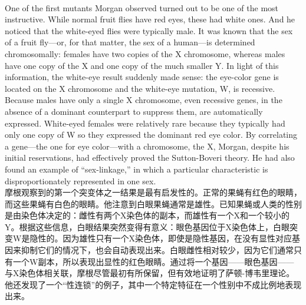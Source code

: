 \documentclass{article}
\begin{document}
\\
One of the first mutants Morgan observed turned out to be one of the most instructive. While normal fruit flies have red eyes, these had white ones. And he noticed that the white-eyed flies were typically male. It was known that the sex of a fruit fly—or, for that matter, the sex of a human—is determined chromosomally: females have two copies of the X chromosome, whereas males have one copy of the X and one copy of the much smaller Y. In light of this information, the white-eye result suddenly made sense: the eye-color gene is located on the X chromosome and the white-eye mutation, W, is recessive. Because males have only a single X chromosome, even recessive genes, in the absence of a dominant counterpart to suppress them, are automatically expressed. White-eyed females were relatively rare because they typically had only one copy of W so they expressed the dominant red eye color. By correlating a gene—the one for eye color—with a chromosome, the X, Morgan, despite his initial reservations, had effectively proved the Sutton-Boveri theory. He had also found an example of “sex-linkage,” in which a particular characteristic is disproportionately represented in one sex.\\
摩根观察到的第一个突变体之一结果是最有启发性的。正常的果蝇有红色的眼睛，而这些果蝇有白色的眼睛。他注意到白眼果蝇通常是雄性。已知果蝇或人类的性别是由染色体决定的：雌性有两个X染色体的副本，而雄性有一个X和一个较小的Y。根据这些信息，白眼结果突然变得有意义：眼色基因位于X染色体上，白眼突变W是隐性的。因为雄性只有一个X染色体，即使是隐性基因，在没有显性对应基因来抑制它们的情况下，也会自动表现出来。白眼雌性相对较少，因为它们通常只有一个W副本，所以表现出显性的红色眼睛。通过将一个基因——眼色基因——与X染色体相关联，摩根尽管最初有所保留，但有效地证明了萨顿-博韦里理论。他还发现了一个“性连锁”的例子，其中一个特定特征在一个性别中不成比例地表现出来。\\
\end{document}
